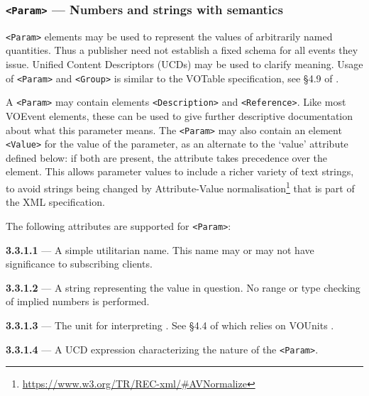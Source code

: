 \documentclass[11pt,a4paper]{ivoa}
\begin{document}
\subsubsection{\texttt{<Param>} --- Numbers and strings with semantics}
\label{sec:3.3.1}
\verb|<Param>| elements may be used to represent the values of arbitrarily named
quantities. Thus a publisher need not establish a fixed schema for all events
they issue. Unified Content Descriptors (UCDs) \citep{2018ivoa.spec.0527P}
may be used to clarify meaning. Usage of \verb|<Param>| and \verb|<Group>| is
similar to the VOTable specification, see \S4.9 of \citep{2019ivoa.spec.1021O}.

A \verb|<Param>| may contain elements \verb|<Description>| and \verb|<Reference>|.
Like most VOEvent elements, these can be used to give further descriptive
documentation about what this parameter means. The \verb|<Param>| may also
contain an element \verb|<Value>| for the value of the parameter, as an alternate
to the `value' attribute defined below: if both are present, the attribute takes
precedence over the element. This allows parameter values to include a richer
variety of text strings, to avoid strings being changed by Attribute-Value
normalisation\footnote{\url{https://www.w3.org/TR/REC-xml/\#AVNormalize}} that
is part of the XML specification.

The following attributes are supported for \verb|<Param>|:

\noindent \textbf{3.3.1.1} \label{sec:3.3.1.1} --- A simple utilitarian
name. This name may or may not have significance to subscribing clients.

\noindent \textbf{3.3.1.2} \label{sec:3.3.1.2} --- A string representing
the value in question. No range or type checking of implied numbers is
performed.

\noindent \textbf{3.3.1.3} \label{sec:3.3.1.3} --- The unit for
interpreting . See \S4.4 of \citep{2019ivoa.spec.1021O}
which relies on VOUnits \citep{2023ivoa.spec.1215G}.

\noindent \textbf{3.3.1.4} \label{sec:3.3.1.4} --- A UCD
\citep{2018ivoa.spec.0527P}
expression characterizing the nature of the \verb|<Param>|.
\end{document}
